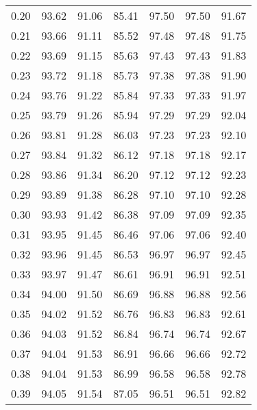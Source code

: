 \begin{tabular}{|c|c|c|c|c|c|c|}
      0.20 &     93.62 &     91.06 &      85.41 &   97.50 &      97.50 &         91.67 \\
      0.21 &     93.66 &     91.11 &      85.52 &   97.48 &      97.48 &         91.75 \\
      0.22 &     93.69 &     91.15 &      85.63 &   97.43 &      97.43 &         91.83 \\
      0.23 &     93.72 &     91.18 &      85.73 &   97.38 &      97.38 &         91.90 \\
      0.24 &     93.76 &     91.22 &      85.84 &   97.33 &      97.33 &         91.97 \\
      0.25 &     93.79 &     91.26 &      85.94 &   97.29 &      97.29 &         92.04 \\
      0.26 &     93.81 &     91.28 &      86.03 &   97.23 &      97.23 &         92.10 \\
      0.27 &     93.84 &     91.32 &      86.12 &   97.18 &      97.18 &         92.17 \\
      0.28 &     93.86 &     91.34 &      86.20 &   97.12 &      97.12 &         92.23 \\
      0.29 &     93.89 &     91.38 &      86.28 &   97.10 &      97.10 &         92.28 \\
      0.30 &     93.93 &     91.42 &      86.38 &   97.09 &      97.09 &         92.35 \\
      0.31 &     93.95 &     91.45 &      86.46 &   97.06 &      97.06 &         92.40 \\
      0.32 &     93.96 &     91.45 &      86.53 &   96.97 &      96.97 &         92.45 \\
      0.33 &     93.97 &     91.47 &      86.61 &   96.91 &      96.91 &         92.51 \\
      0.34 &     94.00 &     91.50 &      86.69 &   96.88 &      96.88 &         92.56 \\
      0.35 &     94.02 &     91.52 &      86.76 &   96.83 &      96.83 &         92.61 \\
      0.36 &     94.03 &     91.52 &      86.84 &   96.74 &      96.74 &         92.67 \\
      0.37 &     94.04 &     91.53 &      86.91 &   96.66 &      96.66 &         92.72 \\
      0.38 &     94.04 &     91.53 &      86.99 &   96.58 &      96.58 &         92.78 \\
      0.39 &     94.05 &     91.54 &      87.05 &   96.51 &      96.51 &         92.82 \\

\end{tabular}
